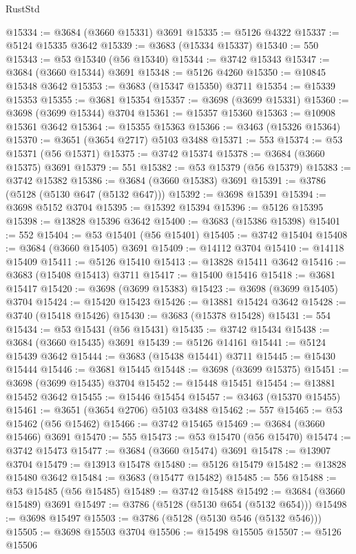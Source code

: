 \begin{lexlean}{RustStd}
\begin{coremodule}
{\begin{coremodule}
{{{{{{{{{{{{{{{{{{{{{{{{{{{{{{{{{{{{{{{{{{{{{{{@15334 := @3684 (@3660 @15331) @3691
@15335 := @5126 @4322
@15337 := @5124 @15335 @3642
@15339 := @3683 (@15334 @15337)
@15340 := 550
@15343 := @53 @15340 (@56 @15340)
@15344 := @3742 @15343
@15347 := @3684 (@3660 @15344) @3691
@15348 := @5126 @4260
@15350 := @10845 @15348 @3642
@15353 := @3683 (@15347 @15350) @3711
@15354 := @15339 @15353
@15355 := @3681 @15354
@15357 := @3698 (@3699 @15331)
@15360 := @3698 (@3699 @15344) @3704
@15361 := @15357 @15360
@15363 := @10908 @15361 @3642
@15364 := @15355 @15363
@15366 := @3463 (@15326 @15364)
@15370 := @3651 (@3654 @2717) @5103 @3488
@15371 := 553
@15374 := @53 @15371 (@56 @15371)
@15375 := @3742 @15374
@15378 := @3684 (@3660 @15375) @3691
@15379 := 551
@15382 := @53 @15379 (@56 @15379)
@15383 := @3742 @15382
@15386 := @3684 (@3660 @15383) @3691
@15391 := @3786 (@5128 (@5130 @647 (@5132 @647)))
@15392 := @3698 @15391
@15394 := @3698 @5152 @3704
@15395 := @15392 @15394
@15396 := @5126 @15395
@15398 := @13828 @15396 @3642
@15400 := @3683 (@15386 @15398)
@15401 := 552
@15404 := @53 @15401 (@56 @15401)
@15405 := @3742 @15404
@15408 := @3684 (@3660 @15405) @3691
@15409 := @14112 @3704
@15410 := @14118 @15409
@15411 := @5126 @15410
@15413 := @13828 @15411 @3642
@15416 := @3683 (@15408 @15413) @3711
@15417 := @15400 @15416
@15418 := @3681 @15417
@15420 := @3698 (@3699 @15383)
@15423 := @3698 (@3699 @15405) @3704
@15424 := @15420 @15423
@15426 := @13881 @15424 @3642
@15428 := @3740 (@15418 @15426)
@15430 := @3683 (@15378 @15428)
@15431 := 554
@15434 := @53 @15431 (@56 @15431)
@15435 := @3742 @15434
@15438 := @3684 (@3660 @15435) @3691
@15439 := @5126 @14161
@15441 := @5124 @15439 @3642
@15444 := @3683 (@15438 @15441) @3711
@15445 := @15430 @15444
@15446 := @3681 @15445
@15448 := @3698 (@3699 @15375)
@15451 := @3698 (@3699 @15435) @3704
@15452 := @15448 @15451
@15454 := @13881 @15452 @3642
@15455 := @15446 @15454
@15457 := @3463 (@15370 @15455)
@15461 := @3651 (@3654 @2706) @5103 @3488
@15462 := 557
@15465 := @53 @15462 (@56 @15462)
@15466 := @3742 @15465
@15469 := @3684 (@3660 @15466) @3691
@15470 := 555
@15473 := @53 @15470 (@56 @15470)
@15474 := @3742 @15473
@15477 := @3684 (@3660 @15474) @3691
@15478 := @13907 @3704
@15479 := @13913 @15478
@15480 := @5126 @15479
@15482 := @13828 @15480 @3642
@15484 := @3683 (@15477 @15482)
@15485 := 556
@15488 := @53 @15485 (@56 @15485)
@15489 := @3742 @15488
@15492 := @3684 (@3660 @15489) @3691
@15497 := @3786 (@5128 (@5130 @654 (@5132 @654)))
@15498 := @3698 @15497
@15503 := @3786 (@5128 (@5130 @546 (@5132 @546)))
@15505 := @3698 @15503 @3704
@15506 := @15498 @15505
@15507 := @5126 @15506
}}}}}}}}}}}}}}}}}}}}}}}}}}}}}}}}}}}}}}}}}}}}}}}
\end{coremodule}}
\end{coremodule}
\end{lexlean}
